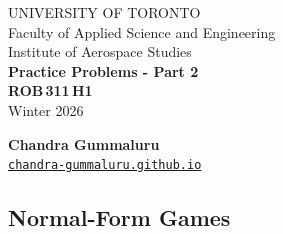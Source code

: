 \documentclass[12pt]{article}
\begin{document}
\begin{center}\large
  UNIVERSITY OF TORONTO\\
  Faculty of Applied Science and Engineering\\[1.75ex]
  Institute of Aerospace Studies\\[1.75ex]
  \textbf{Practice Problems - Part 2} \\
  \textbf{ROB\,311\,H1} \\[4mm]
  Winter 2026

  \vspace{3cm}
  \textbf{Chandra Gummaluru} \\
  \href{https://chandra-gummaluru.github.io}{\texttt{chandra-gummaluru.github.io}}
\end{center}

\clearpage

\subsection*{Normal-Form Games}
\end{document}
